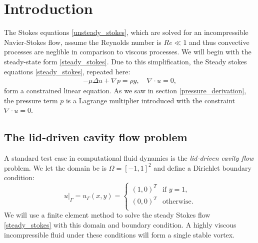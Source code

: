 \section{Introduction}
The Stokes equations \eqref{unsteady_stokes}, which are solved for an incompressible Navier-Stokes flow,
assume the Reynolds number is $Re \ll 1$ and thus convective processes are neglible in comparison to viscous processes.
We will begin with the steady-state form \eqref{steady_stokes}.
Due to this simplification, the Steady stokes equations \eqref{steady_stokes}, repeated here:
\begin{align*}
    -\mu\Delta u + \nabla p = \rho g, \quad \nabla\cdot u = 0,
\end{align*}
form a constrained linear equation. As we saw in section \ref{pressure_derivation}, the pressure term $p$ is a Lagrange multiplier introduced
with the constraint $\nabla\cdot u = 0$.
\subsection{The lid-driven cavity flow problem}
A standard test case in computational fluid dynamics is the \textit{lid-driven cavity flow} problem.
We let the domain be is $\Omega = [-1,1]^2$ and define a Dirichlet boundary condition:
\begin{equation}\label{lid_driven_boundary_condition}
    \left.u\right|_\Gamma = u_\Gamma(x,y) =
    \left\{\begin{array}{lr}
        \left(1, 0\right)^T &\text{if $y = 1$,}\\
        \left(0, 0\right)^T &\text{otherwise}.\\
        \end{array}\right.
\end{equation}
We will use a finite element method to solve the steady Stokes flow \eqref{steady_stokes} with this domain and boundary condition. A highly viscous incompressible
fluid under these conditions will form a single stable vortex.

